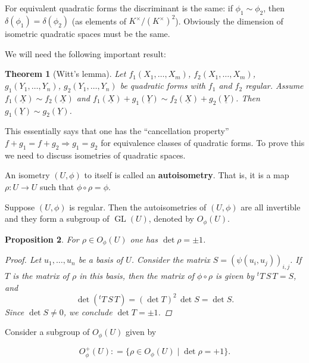 \documentclass{article}
\newcommand{\term}{\textbf}
\newcommand{\dfn}{\mathrel{\mathop:}=}
\DeclareMathOperator{\GL}{GL}
\theoremstyle{myplain}
\newtheorem{proposition}{Proposition}[section]
\newtheorem{theorem}[proposition]{Theorem}
\theoremstyle{mydefinition}
\begin{document}
For equivalent quadratic forms the discriminant is the same: if
$\phi_1 \sim \phi_2$, then $\delta (\phi_1) = \delta (\phi_2)$ (as elements of
$K^\times/(K^\times)^2$). Obviously the dimension of isometric quadratic spaces
must be the same.

\vspace{1em}

We will need the following important result:

\begin{theorem}[Witt's lemma]\label{theorem:witt-lemma}
  Let $f_1 (X_1,\ldots,X_m)$, $f_2 (X_1,\ldots,X_m)$, $g_1 (Y_1,\ldots,Y_n)$,
  $g_2 (Y_1,\ldots,Y_n)$ be quadratic forms with $f_1$ and $f_2$ regular. Assume
  $f_1 (\underline{X}) \sim f_2 (\underline{X})$ and
  $f_1 (\underline{X}) + g_1 (\underline{Y}) \sim f_2 (\underline{X}) + g_2 (\underline{Y})$.
  Then $g_1 (\underline{Y}) \sim g_2 (\underline{Y})$.
\end{theorem}

This essentially says that one has the ``cancellation property''
$f + g_1 = f + g_2 \Rightarrow g_1 = g_2$ for equivalence classes of quadratic
forms. To prove this we need to discuss isometries of quadratic spaces.

\vspace{1em}

An isometry $(U,\phi)$ to itself is called an \term{autoisometry}. That is, it
is a map $\rho\colon U\to U$ such that $\phi\circ \rho = \phi$.

Suppose $(U,\phi)$ is regular. Then the autoisometries of $(U,\phi)$ are all
invertible and they form a subgroup of $\GL (U)$, denoted by $O_\phi (U)$.

\begin{proposition}
  For $\rho \in O_\phi (U)$ one has $\det \rho = \pm 1$.

  \begin{proof}
    Let $u_1, \ldots, u_n$ be a basis of $U$. Consider the matrix
    $S = (\psi (u_i, u_j))_{i,j}$. If $T$ is the matrix of $\rho$ in this basis,
    then the matrix of $\phi\circ \rho$ is given by ${}^t T \, S \, T = S$, and
    \[ \det ({}^t T \, S \, T) = (\det T)^2 \, \det S = \det S. \]
    Since $\det S \ne 0$, we conclude $\det T = \pm 1$.
  \end{proof}
\end{proposition}

Consider a subgroup of $O_\phi (U)$ given by

\[ O_\phi^+ (U) \dfn \{ \rho \in O_\phi (U) \mid \det \rho = +1 \}. \]
\end{document}
